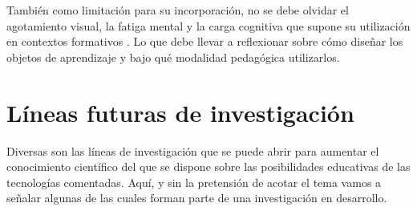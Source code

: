 \documentclass[spanish]{textolivre}
\begin{document}
También como limitación para su incorporación, no se debe olvidar el agotamiento visual, la fatiga mental y la carga cognitiva que supone su utilización en contextos formativos \cite{bermejo_2023,cabero_2023,bautista_2022}. Lo que debe llevar a reflexionar sobre cómo diseñar los objetos de aprendizaje y bajo qué modalidad pedagógica utilizarlos.


\section{Líneas futuras de investigación}\label{sec-conduta}
Diversas son las líneas de investigación que se puede abrir para aumentar el conocimiento científico del que se dispone sobre las posibilidades educativas de las tecnologías comentadas. Aquí, y sin la pretensión de acotar el tema vamos a señalar algunas de las cuales forman parte de una investigación en desarrollo.
\end{document}
